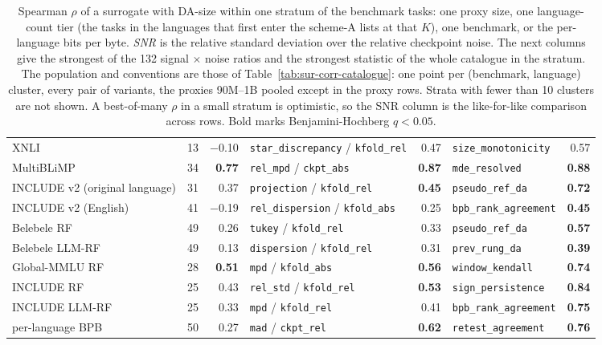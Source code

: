 \begin{table}[t]
\begin{tabular}{@{}lrrlrlr@{}}
XNLI & 13 & $-$0.10 & \texttt{star\_discrepancy} / \texttt{kfold\_rel} & 0.47 & \texttt{size\_monotonicity} & 0.57 \\
MultiBLiMP & 34 & \textbf{0.77} & \texttt{rel\_mpd} / \texttt{ckpt\_abs} & \textbf{0.87} & \texttt{mde\_resolved} & \textbf{0.88} \\
INCLUDE v2 (original language) & 31 & 0.37 & \texttt{projection} / \texttt{kfold\_rel} & \textbf{0.45} & \texttt{pseudo\_ref\_da} & \textbf{0.72} \\
INCLUDE v2 (English) & 41 & $-$0.19 & \texttt{rel\_dispersion} / \texttt{kfold\_abs} & 0.25 & \texttt{bpb\_rank\_agreement} & \textbf{0.45} \\
Belebele RF & 49 & 0.26 & \texttt{tukey} / \texttt{kfold\_rel} & 0.33 & \texttt{pseudo\_ref\_da} & \textbf{0.57} \\
Belebele LLM-RF & 49 & 0.13 & \texttt{dispersion} / \texttt{kfold\_rel} & 0.31 & \texttt{prev\_rung\_da} & \textbf{0.39} \\
Global-MMLU RF & 28 & \textbf{0.51} & \texttt{mpd} / \texttt{kfold\_abs} & \textbf{0.56} & \texttt{window\_kendall} & \textbf{0.74} \\
INCLUDE RF & 25 & 0.43 & \texttt{rel\_std} / \texttt{kfold\_rel} & \textbf{0.53} & \texttt{sign\_persistence} & \textbf{0.84} \\
INCLUDE LLM-RF & 25 & 0.33 & \texttt{mpd} / \texttt{kfold\_rel} & 0.41 & \texttt{bpb\_rank\_agreement} & \textbf{0.75} \\
\midrule
per-language BPB & 50 & 0.27 & \texttt{mad} / \texttt{ckpt\_rel} & \textbf{0.62} & \texttt{retest\_agreement} & \textbf{0.76} \\
\bottomrule
\end{tabular}
\caption{Spearman $\rho$ of a surrogate with DA-size within one stratum of the benchmark tasks: one proxy size, one language-count tier (the tasks in the languages that first enter the scheme-A lists at that $K$), one benchmark, or the per-language bits per byte. \emph{SNR} is the relative standard deviation over the relative checkpoint noise. The next columns give the strongest of the 132 signal $\times$ noise ratios and the strongest statistic of the whole catalogue in the stratum. The population and conventions are those of Table~\ref{tab:sur-corr-catalogue}: one point per (benchmark, language) cluster, every pair of variants, the proxies 90M--1B pooled except in the proxy rows. Strata with fewer than 10 clusters are not shown. A best-of-many $\rho$ in a small stratum is optimistic, so the SNR column is the like-for-like comparison across rows. Bold marks Benjamini-Hochberg $q < 0.05$.}
\label{tab:sur-corr-strata}
\end{table}
